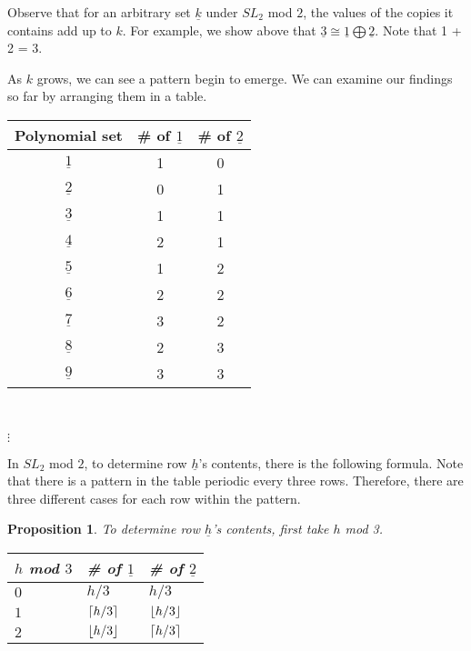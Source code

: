 \documentclass[a4paper,draft]{amsproc}
\DeclarePairedDelimiter{\ceil}{\lceil}{\rceil}
\DeclarePairedDelimiter{\floor}{\lfloor}{\rfloor}
\theoremstyle{plain}
\newtheorem{prop}{Proposition}[section]
\theoremstyle{definition}
\theoremstyle{remark}
\numberwithin{equation}{section}
\begin{document}
Observe that for an arbitrary set $\underline{k}$ under $SL_{2}$ mod $2$, the values of the copies it contains add up to $k$. For example, we show above that $\underline{3} \cong \underline{1} \bigoplus \underline{2}$. Note that 1 + 2 = 3. 

As $k$ grows, we can see a pattern begin to emerge. We can examine our findings so far by arranging them in a table. 

\begin{table}[h]
    \begin{tabular}{|c|c|c|} 
	\hline
    Polynomial set & \# of $\underline{1}$ & \# of $\underline{2}$ \\ \hline
    $\underline{1}$ & 1 & 0 \\ \hline
    $\underline{2}$ & 0 & 1 \\ \hline
    $\underline{3}$ & 1 & 1 \\ \hline
    $\underline{4}$ & 2 & 1 \\ \hline
    $\underline{5}$ & 1 & 2 \\ \hline
    $\underline{6}$ & 2 & 2 \\ \hline
    $\underline{7}$ & 3 & 2 \\ \hline
    $\underline{8}$ & 2 & 3 \\ \hline
    $\underline{9}$ & 3 & 3 \\ \hline
    \end{tabular} \\
\begin{centering}$\vdots$\end{centering}
\end{table} 

In $SL_{2}$ mod $2$, to determine row $\underline{h}$'s contents, there is the following formula. Note that there is a pattern in the table periodic every three rows. Therefore, there are three different cases for each row within the pattern.
\begin{prop}
To determine row $\underline{h}$'s contents, first take $h$ mod 3. \\

\begin{table}[h]
\centering
    \begin{tabular}{|l|l|l|}
    \hline
    $h$ mod $3$ & \# of $\underline{1}$ & \# of $\underline{2}$ \\ \hline
    $0$ & $h/3$     & $h/3$     \\ \hline
    $1$ & $\ceil*{h/3}$     & $\floor*{h/3}$     \\ \hline
    $2$ & $\floor*{h/3}$     & $\ceil*{h/3}$     \\ \hline
    \end{tabular}
\end{table}

\end{prop}
\end{document}
